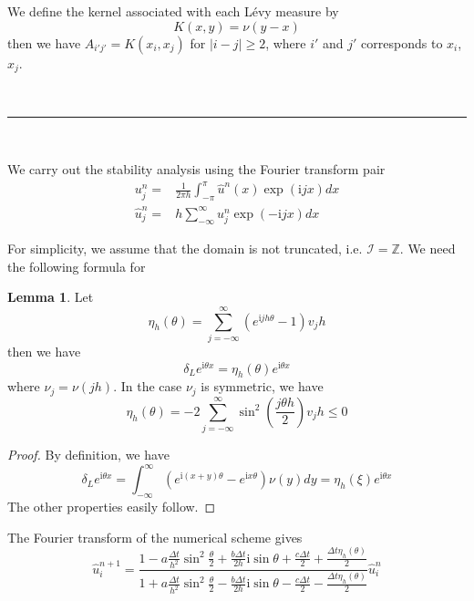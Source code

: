 \documentclass[10pt,a4paper]{article}
\newcommand{\ii}[0]{\mathrm{i}}
\theoremstyle{definition}
\newtheorem{lemma}{Lemma}
\begin{document}
We define the kernel associated with each L\'evy measure by
\begin{equation}
	K(x,y) = \nu(y-x)
\end{equation}
then we have $A_{i'j'}=K(x_{i},x_{j})$ for $|i-j|\geq 2$, where $i'$ and $j'$ corresponds to $x_{i}$, $x_j$.

\

\hrule

\

We carry out the stability analysis using the Fourier transform pair
\begin{align}
	u_j^n =& \frac{1}{2\pi h}\int_{-\pi}^\pi \hat u^n(x) \exp(\ii j x)dx\\
	\hat u_j^n =&  h \sum_{-\infty}^\infty u_j^n \exp(-\ii jx)dx
\end{align}

For simplicity, we assume that the domain is not truncated, i.e. $\mathcal{I}=\mathbb{Z}$. We need the following formula for 
\begin{lemma}
	Let 
	\begin{equation}
		\eta_h(\theta) = \sum_{j=-\infty}^\infty (e^{\ii jh\theta}-1)v_jh
	\end{equation}
	then we have
	\begin{equation}
		\delta_L e^{\ii \theta x} = \eta_h(\theta) e^{\ii \theta x}
	\end{equation}
	where $\nu_j = \nu(jh)$. In the case $\nu_j$ is symmetric, we have
	\begin{equation}
		\eta_h(\theta) = -2\sum_{j=-\infty}^\infty \sin^2\left(\frac{j\theta h}{2} \right) v_jh\leq 0
	\end{equation}
\end{lemma}
\begin{proof}
	By definition, we have
	\[{\delta _L}{e^{\ii\theta x}} = \int_{ - \infty }^\infty  {\left( {{e^{\ii(x + y)\theta }} - {e^{\ii x\theta }}} \right)\nu (y)dy = {\eta _h}(\xi )} {e^{\ii\theta x}}\]
	The other properties easily follow. 
\end{proof}

The Fourier transform of the numerical scheme gives
\begin{equation}\label{equ:von}
	\hat u_i^{n+1} = \frac{{1 - a\frac{{\Delta t}}{{{h^2}}}{{\sin }^2}\frac{\theta }{2} + \frac{{b\Delta t}}{{2h}}\ii\sin \theta  + \frac{{c\Delta t}}{2}+ \frac{{\Delta t\eta_h (\theta )}}{2}}}{{1 + a\frac{{\Delta t}}{{{h^2}}}{{\sin }^2}\frac{\theta }{2} - \frac{{b\Delta t}}{{2h}}\ii\sin \theta  - \frac{{c\Delta t}}{2} - \frac{{\Delta t\eta_h (\theta )}}{2}}} \hat u_i^n
\end{equation}
\end{document}

